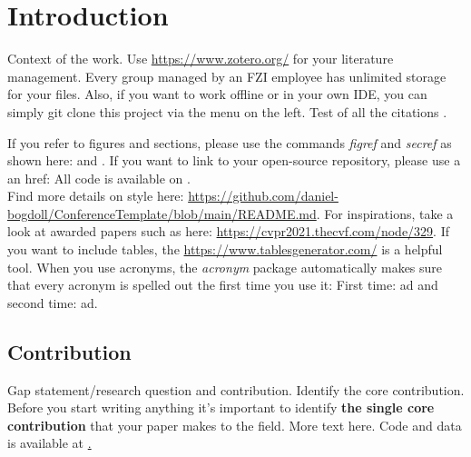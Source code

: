 \section{Introduction}
\label{sec:introduction}

Context of the work. Use \url{https://www.zotero.org/} for your literature management. Every group managed by an FZI employee has unlimited storage for your files. Also, if you want to work offline or in your own IDE, you can simply git clone this project via the menu on the left. Test of all the citations
\cite{Bogdoll_Compressing_2021_NeurIPS}
\cite{Bogdoll_Description_2021_ICCV}
\cite{Bogdoll_KIGLIS_2021_ISC2}
\cite{Bogdoll_Taxonomy_2021_arXiv}
\cite{Toettel_Reliving_2021_arXiv}
\cite{Reichert_Towards_2021_ISC2}
\cite{Bogdoll_Augmenting_2017_US}
\cite{Koduri_Aureate_2018_WCX, Asam_Openscenario_2020_Web}.

If you refer to figures and sections, please use the commands \textit{figref} and \textit{secref} as shown here:  and . If you want to link to your open-source repository, please use a an href: All code is available on \href{https://github.com/daniel-bogdoll/deep_generative_models}{\color{wong-lightblue}{GitHub}}. \\

Find more details on style here: \url{https://github.com/daniel-bogdoll/ConferenceTemplate/blob/main/README.md}. For inspirations, take a look at awarded papers such as here: \url{https://cvpr2021.thecvf.com/node/329}. If you want to include tables, the \url{https://www.tablesgenerator.com/} is a helpful tool. When you use acronyms, the \textit{acronym} package automatically makes sure that every acronym is spelled out the first time you use it: First time: \ac{ad} and second time: \ac{ad}.

\subsection{Contribution}
Gap statement/research question and contribution. Identify the core contribution. Before you start writing anything it’s important to identify \textbf{the single core contribution} that your paper makes to the field. More text here. Code and data is
available at \href{https://github.com/xxxxx}.

